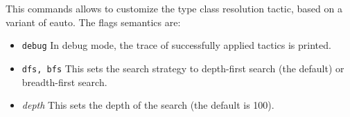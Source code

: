 This commands allows to customize the type class resolution tactic,
based on a variant of eauto. The flags semantics are:
\begin{itemize}
\item {\tt debug} In debug mode, the trace of successfully applied
  tactics is printed.
\item {\tt dfs, bfs} This sets the search strategy to depth-first search
  (the default) or breadth-first search.
\item {\emph{depth}} This sets the depth of the search (the default is 100).
\end{itemize}

